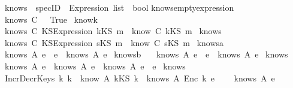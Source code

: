 \begin{isabellebody}
\isanewline
{}\isamarkupfalse \isanewline
\ \ knows\ {\isacharcolon}{\isacharcolon}\ {\isachardoublequoteopen}specID\ {\isasymRightarrow}\ Expression\ list\ {\isasymRightarrow}\ bool{\isachardoublequoteclose}\isanewline
{}\isanewline
knows{\isacharunderscore}emptyexpression{\isacharcolon}\isanewline
\ \ {\isachardoublequoteopen}knows\ C\ {\isacharbrackleft}{\isacharbrackright}\ {\isacharequal}\ True{\isachardoublequoteclose}\ \isanewline
know{}k{\isacharcolon}\ \isanewline
\ \ {\isachardoublequoteopen}knows\ C\ {\isacharbrackleft}KS{}Expression\ {\isacharparenleft}kKS\ m{}{\isacharparenright}{\isacharbrackright}\ {\isacharequal}\ know\ C\ {\isacharparenleft}kKS\ m{}{\isacharparenright}{\isachardoublequoteclose}\ \isanewline
know{}s{\isacharcolon}\isanewline
\ \ {\isachardoublequoteopen}knows\ C\ {\isacharbrackleft}KS{}Expression\ {\isacharparenleft}sKS\ m{}{\isacharparenright}{\isacharbrackright}\ {\isacharequal}\ know\ C\ {\isacharparenleft}sKS\ m{}{\isacharparenright}{\isachardoublequoteclose}\ \isanewline
knows{}a{\isacharcolon}\ \isanewline
\ \ {\isachardoublequoteopen}knows\ A\ {\isacharparenleft}e{}\ {\isacharat}\ e{\isacharparenright}\ {\isasymlongrightarrow}\ knows\ A\ e{\isachardoublequoteclose}\ \isanewline
knows{}b{\isacharcolon}\ \isanewline
\ \ {\isachardoublequoteopen}knows\ A\ {\isacharparenleft}e\ {\isacharat}\ e{}{\isacharparenright}\ {\isasymlongrightarrow}\ knows\ A\ e{\isachardoublequoteclose}\ \isanewline
knows{}{\isacharcolon}\ \isanewline
\ \ {\isachardoublequoteopen}{\isacharparenleft}knows\ A\ e{}{\isacharparenright}\ {\isasymand}\ {\isacharparenleft}knows\ A\ e{}{\isacharparenright}\ {\isasymlongrightarrow}\ knows\ A\ {\isacharparenleft}e{}\ {\isacharat}\ e{}{\isacharparenright}{\isachardoublequoteclose}\ \isanewline
knows{}{\isacharcolon}\ \isanewline
\ \ {\isachardoublequoteopen}{\isacharparenleft}IncrDecrKeys\ k{}\ k{}{\isacharparenright}\ {\isasymand}\ {\isacharparenleft}know\ A\ {\isacharparenleft}kKS\ k{}{\isacharparenright}{\isacharparenright}\ {\isasymand}\ {\isacharparenleft}knows\ A\ {\isacharparenleft}Enc\ k{}\ e{\isacharparenright}{\isacharparenright}\isanewline
\ \ \ {\isasymlongrightarrow}\ knows\ A\ e{\isachardoublequoteclose}\ \isanewline

\end{isabellebody}
